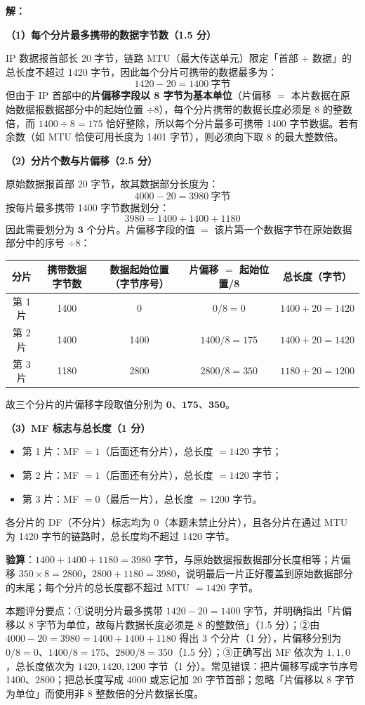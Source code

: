 \documentclass[a4paper,11pt]{article}
\begin{document}
\q \textbf{解：}

\textbf{（1）每个分片最多携带的数据字节数（1.5 分）}

IP 数据报首部长 20 字节，链路 MTU（最大传送单元）限定「首部 \(+\) 数据」的总长度不超过 1420 字节，因此每个分片可携带的数据最多为：
\[
1420-20=1400\ \text{字节}
\]
但由于 IP 首部中的\textbf{片偏移字段以 8 字节为基本单位}（片偏移 \(=\) 本片数据在原始数据报数据部分中的起始位置 \(\div 8\)），每个分片携带的数据长度必须是 8 的整数倍，而 \(1400\div 8=175\) 恰好整除，所以每个分片最多可携带 1400 字节数据。若有余数（如 MTU 恰使可用长度为 1401 字节），则必须向下取 8 的最大整数倍。

\textbf{（2）分片个数与片偏移（2.5 分）}

原始数据报首部 20 字节，故其数据部分长度为：
\[
4000-20=3980\ \text{字节}
\]
按每片最多携带 1400 字节数据划分：
\[
3980=1400+1400+1180
\]
因此需要划分为 \(\mathbf{3}\) 个分片。片偏移字段的值 \(=\) 该片第一个数据字节在原始数据部分中的序号 \(\div 8\)：
\begin{center}
\begin{tabular}{ccccc}
\toprule
分片 & 携带数据字节数 & 数据起始位置（字节序号） & 片偏移 \(=\) 起始位置/8 & 总长度（字节） \\
\midrule
第 1 片 & 1400 & 0     & \(0/8=0\)        & \(1400+20=1420\) \\
第 2 片 & 1400 & 1400  & \(1400/8=175\)   & \(1400+20=1420\) \\
第 3 片 & 1180 & 2800  & \(2800/8=350\)   & \(1180+20=1200\) \\
\bottomrule
\end{tabular}
\end{center}
故三个分片的片偏移字段取值分别为 \(\mathbf{0}\)、\(\mathbf{175}\)、\(\mathbf{350}\)。

\textbf{（3）MF 标志与总长度（1 分）}
\begin{itemize}[leftmargin=2em, itemsep=2pt, topsep=3pt]
  \item 第 1 片：MF \(=1\)（后面还有分片），总长度 \(=1420\) 字节；
  \item 第 2 片：MF \(=1\)（后面还有分片），总长度 \(=1420\) 字节；
  \item 第 3 片：MF \(=0\)（最后一片），总长度 \(=1200\) 字节。
\end{itemize}
各分片的 DF（不分片）标志均为 0（本题未禁止分片），且各分片在通过 MTU 为 1420 字节的链路时，总长度均不超过 1420 字节。

\textbf{验算}：\(1400+1400+1180=3980\) 字节，与原始数据报数据部分长度相等；片偏移 \(350\times 8=2800\)，\(2800+1180=3980\)，说明最后一片正好覆盖到原始数据部分的末尾；每个分片的总长度都不超过 MTU \(=1420\) 字节。

\begin{analysis}
本题评分要点：①说明分片最多携带 \(1420-20=1400\) 字节，并明确指出「片偏移以 8 字节为单位，故每片数据长度必须是 8 的整数倍」（1.5 分）；②由 \(4000-20=3980=1400+1400+1180\) 得出 3 个分片（1 分），片偏移分别为 \(0/8=0\)、\(1400/8=175\)、\(2800/8=350\)（1.5 分）；③正确写出 MF 依次为 \(1,1,0\)，总长度依次为 \(1420,1420,1200\) 字节（1 分）。常见错误：把片偏移写成字节序号 1400、2800；把总长度写成 4000 或忘记加 20 字节首部；忽略「片偏移以 8 字节为单位」而使用非 8 整数倍的分片数据长度。
\end{analysis}
\end{document}
